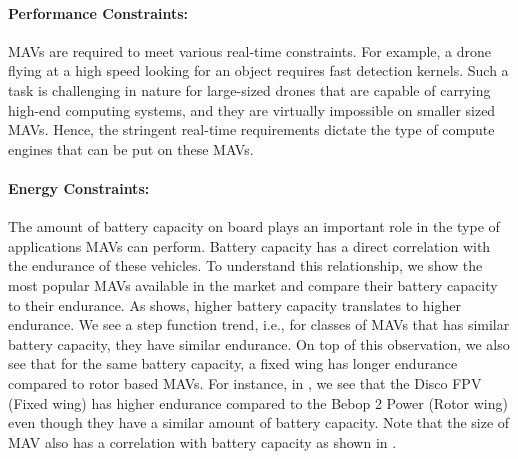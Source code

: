 
\paragraph{Performance Constraints:} MAVs are required to meet various real-time constraints. For example, a drone flying at a high speed looking for an object requires fast detection kernels. Such a task is challenging in nature for large-sized drones that are capable of carrying high-end computing systems, and they are virtually impossible on smaller sized MAVs. Hence, the stringent real-time requirements dictate the type of compute engines that can be put on these MAVs.

\paragraph{Energy Constraints:} The amount of battery capacity on board plays an important role in the type of applications MAVs can perform. Battery capacity has a direct correlation with the endurance of these vehicles. To understand this relationship, we show the most popular MAVs available in the market and compare their battery capacity to their endurance. As  shows, higher battery capacity translates to higher endurance. We see a step function trend, i.e., for classes of MAVs that has similar battery capacity, they have similar endurance. On top of this observation, we also see that for the same battery capacity, a fixed wing has longer endurance compared to rotor based MAVs. For instance, in , we see that the Disco FPV (Fixed wing) has higher endurance compared to the Bebop 2 Power (Rotor wing) even though they have a similar amount of battery capacity.
Note that the size of MAV also has a correlation with battery capacity as shown in . 

